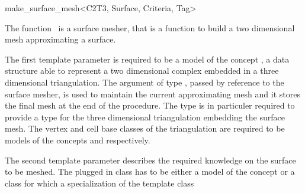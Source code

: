 

\begin{ccRefFunction}{make_surface_mesh<C2T3, Surface, Criteria, Tag>}  %


\ccDefinition
  
The function \ccRefName\ is a surface mesher,
that is a function to build a two dimensional mesh 
approximating  a surface.

The first template parameter  
is required to be a model of the concept
,
a data structure able to represent a two dimensional
complex  embedded in a three dimensional triangulation.
The argument  of type ,  passed by reference
to the surface mesher, 
is used to maintain  the current approximating mesh and it stores
the final mesh at the end of the procedure.
The type  is in particuler required to
provide a type 
for the three dimensional triangulation
embedding the surface mesh.
The vertex and cell base classes of the triangulation
 are required
to be  models  of the concepts 
 and 
 respectively.


The second template parameter describes the required knowledge
on the surface to be meshed. The plugged in class has to be 
either a model of the concept 
or a class for which a specialization of the
template class 
\end{ccRefFunction}
